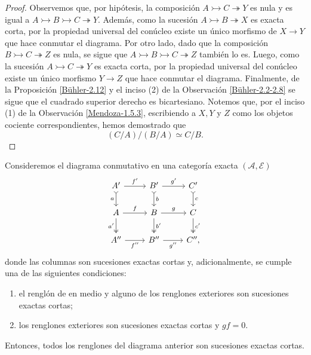 \documentclass[tesis]{subfiles}
\begin{document}
\begin{proof}
    Observemos que, por hipótesis, la composición $A\rightarrowtail C\twoheadrightarrow Y$ es nula y es igual a $A\rightarrowtail B\rightarrowtail C\twoheadrightarrow Y$. Además, como la sucesión $A\rightarrowtail B\twoheadrightarrow X$ es exacta corta, por la propiedad universal del conúcleo existe un único morfismo de $X\to Y$ que hace conmutar el diagrama. Por otro lado, dado que la composición $B\rightarrowtail C\twoheadrightarrow Z$ es nula, se sigue que $A\rightarrowtail B\rightarrowtail C\twoheadrightarrow Z$ también lo es. Luego, como la sucesión $A\rightarrowtail C\twoheadrightarrow Y$ es exacta corta, por la propiedad universal del conúcleo existe un único morfismo $Y\to Z$ que hace conmutar el diagrama. Finalmente, de la Proposición \ref{Bühler-2.12} y el inciso (2) de la Observación \ref{Bühler-2.2-2.8} se sigue que el cuadrado superior derecho es bicartesiano. Notemos que, por el inciso (1) de la Observación \ref{Mendoza-1.5.3}, escribiendo a $X,Y$ y $Z$ como los objetos cociente correspondientes, hemos demostrado que
    \[
        (C/A) / (B/A) \simeq C/B.
    \] 
\end{proof}

\begin{Coro}\label{Bühler-3.6}
    Consideremos el diagrama conmutativo en una categoría exacta $(\mathscr{A},\mathscr{E})$
    \begin{equation}\label{Bühler-3.6-0}
        \begin{tikzcd}
            A' \arrow[tail]{d}[swap]{a} \arrow[]{r}[]{f'} &B' \arrow[tail]{d}[]{b} \arrow[]{r}[]{g'} &C' \arrow[tail]{d}[]{c} \\
            A \arrow[two heads]{d}[swap]{a'} \arrow[]{r}[]{f} &B \arrow[two heads]{d}[]{b'} \arrow[]{r}[]{g} &C \arrow[two heads]{d}[]{c'} \\
            A'' \arrow[]{r}[swap]{f''} &B'' \arrow[]{r}[swap]{g''} &C'',
        \end{tikzcd}
    \end{equation}
    donde las columnas son sucesiones exactas cortas y, adicionalmente, se cumple una de las siguientes condiciones:
    \begin{enumerate}[label=(\alph*)]
    
        \item el renglón de en medio y alguno de los renglones exteriores son sucesiones exactas cortas;

        \item los renglones exteriores son sucesiones exactas cortas y $gf=0$.
    \end{enumerate}
    Entonces, todos los renglones del diagrama anterior son sucesiones exactas cortas.
\end{Coro}
\end{document}

